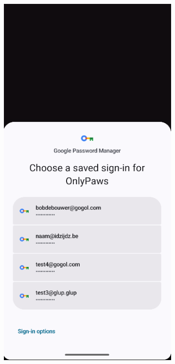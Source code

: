 \documentclass{report}
\begin{document}
\begin{figure}[h]
    \centering
    \begin{subfigure}[b]{0.32\textwidth}
        \includegraphics[width=\textwidth]{DEMO_login.png} 

\end{subfigure}
\end{figure}
\end{document}
